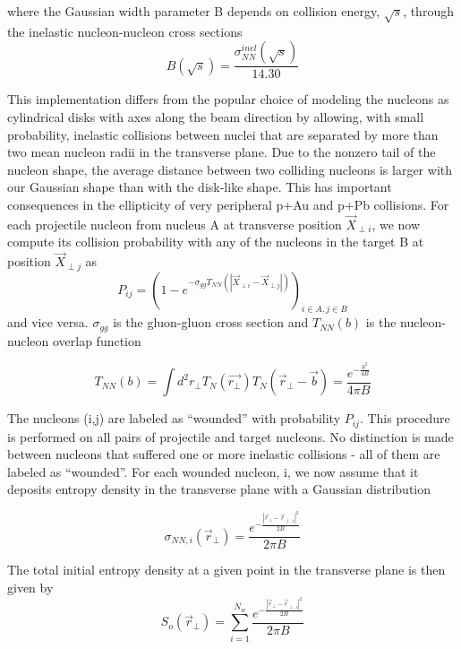 \documentclass[twocolumn,showpacs,amsfonts,aps,prc,nofootinbib,floatfix]{revtex4}
\begin{document}
where the Gaussian width parameter B depends on collision energy, $\sqrt{s}$, through the inelastic nucleon-nucleon cross sections
\begin{equation}
	B(\sqrt{s}) = \frac{\sigma_{NN}^{inel}(\sqrt{s})}{14.30}
\end{equation}

This implementation differs from the popular choice of modeling the nucleons as cylindrical disks with axes along the beam direction by allowing, with small probability, inelastic collisions between nuclei that are separated by more than two mean nucleon radii in the transverse plane. Due to the nonzero tail of the nucleon shape, the average distance between two colliding nucleons is larger with our Gaussian shape than with the disk-like shape.  This has important consequences in the ellipticity of very peripheral p+Au and p+Pb collisions. For each projectile nucleon from nucleus A at transverse position $\vec{X}_{\perp i}$, we now compute its collision probability with any of the nucleons in the target B at position  $\vec{X}_{\perp j}$ as
\begin{equation}
	P_{ij} = (1-e^{-\sigma_{gg} T_{NN}(|\vec{X}_{\perp i}-\vec{X}_{\perp j}|)})_{i\in A, j\in B}
	\label{eq:CollisionProb}
\end{equation}
and vice versa. $\sigma_{gg}$ is the gluon-gluon cross section and $T_{NN}(b)$ is the nucleon-nucleon overlap function  \cite{Heinz:2011mh}

\begin{equation}
	\label{eq:NuclearOverlap}
	T_{NN}(b) = \int d^2 r_{\perp} T_{N}(\vec{r_{\perp}}) T_{N}(\vec{r}_{\perp}-\vec{b}) = \frac{e^{-\frac{b^2}{4B}}}{4\pi B}
\end{equation}

The nucleons (i,j) are labeled as “wounded” with probability $P_{ij}$. This procedure is performed on all pairs of projectile and target nucleons. No distinction is made between nucleons that suffered one or more inelastic collisions - all of them are labeled as “wounded”. For each wounded nucleon, i, we now assume that it deposits entropy density in the transverse plane with a Gaussian distribution 

\begin{equation}
	\sigma_{NN,i}(\vec{r}_{\perp}) = \frac{e^{-\frac{|\vec{r}_{\perp}-\vec{r}_{\perp,i}|^2}{2B}}}{2\pi B}
\end{equation}

The total initial entropy density at a given point in the transverse plane is then given by
\begin{equation}
	S_{o}(\vec{r}_{\perp}) = \sum\limits_{i=1}^{N_{w}} \frac{e^{-\frac{|\vec{r}_{\perp}-\vec{r}_{\perp,i}|^2}{2B}}}{2\pi B}
\end{equation}
\end{document}
